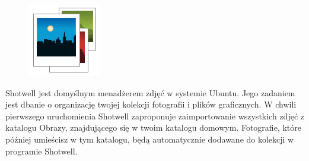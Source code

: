 \label{shotwell}\begin{figure}
	\vspace{-10pt}
	\includegraphics[width=\linewidth]{images/ikony_shotwell.png}
\end{figure}

Shotwell jest domyślnym menadżerem zdjęć w systemie Ubuntu. Jego zadaniem jest dbanie o organizację twojej kolekcji fotografii i plików graficznych. W chwili pierwszego uruchomienia Shotwell zaproponuje zaimportowanie wszystkich zdjęć z katalogu Obrazy, znajdującego się w twoim katalogu domowym. Fotografie, które później umieścisz w tym katalogu, będą automatycznie dodawane do kolekcji w programie Shotwell.

